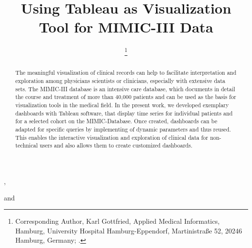 \documentclass[aac,crcready]{iosart2x}
\begin{document}
\begin{frontmatter}

{\centering \title{Using Tableau as Visualization Tool for MIMIC-III Data
}}


\author[A]{ %
\thanks{Corresponding Author, Karl Gottfried, Applied Medical Informatics, Hamburg, University Hospital Hamburg-Eppendorf, Martinistraße 52, 20246 Hamburg, Germany;  .}},
\author[A]{ }
and
\author[A]{ }
\address[A]{Applied Medical Informatics, , Germany, ,
}
\address[B]{Department first, ,
Abbreviate US states, }


\begin{abstract}
The meaningful visualization of clinical records can help to facilitate interpretation and exploration among physicians scientists or clinicians, especially with extensive data sets. The MIMIC-III database is an intensive care database, which documents in detail the course and treatment of more than 40,000 patients and can be used as the basis for visualization tools in the medical field. In the present work, we developed exemplary dashboards with Tableau software, that display time series for individual patients and for a selected cohort on the MIMIC-Database. Once created, dashboards can be adapted for specific queries by implementing of dynamic parameters and thus reused. This enables the interactive visualization and exploration of clinical data for non-technical users and also allows them to create customized dashboards.
\end{abstract}

\begin{keyword}
\end{keyword}

\end{frontmatter}
\end{document}
